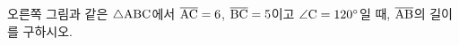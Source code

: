 \noindent\begin{minipage}[t]{0.58\linewidth}\vspace{0pt}\raggedright 오른쪽 그림과 같은 $\triangle\mathrm{ABC}$에서 $\overline{\mathrm{AC}}=6$, $\overline{\mathrm{BC}}=5$이고 $\angle\mathrm{C}=120^\circ$일 때, $\overline{\mathrm{AB}}$의 길이를 구하시오.\end{minipage}\hfill\begin{minipage}[t]{0.4\linewidth}\vspace{0pt}\centering \resizebox{\ifdim\width>\linewidth\linewidth\else\width\fi}{!}{}\end{minipage}\par
